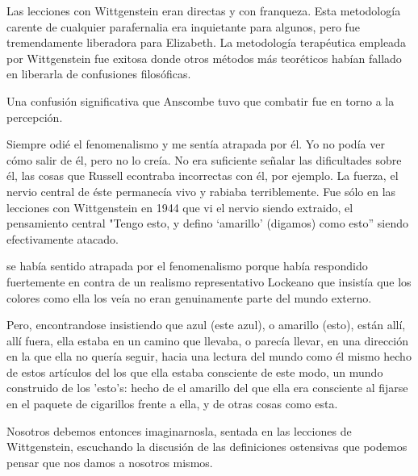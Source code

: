    Las lecciones con Wittgenstein eran directas y con franqueza. Esta metodología
   carente de cualquier parafernalia era inquietante para algunos, pero fue
   tremendamente liberadora para Elizabeth. La metodología terapéutica empleada por
   Wittgenstein fue exitosa donde otros métodos más teoréticos habían fallado en
   liberarla de confusiones filosóficas.\autocite[loc 9853 Chapter 4, Section 24,
   \S5]{monk1991duty}

   Una confusión significativa que Anscombe tuvo que combatir fue en torno a la
   percepción.

   Siempre odié el fenomenalismo y me sentía atrapada por él. Yo no podía ver cómo
   salir de él, pero no lo creía. No era suficiente señalar las dificultades sobre
   él, las cosas que Russell econtraba incorrectas con él, por ejemplo. La fuerza,
   el nervio central de éste permanecía vivo y rabiaba terriblemente. Fue sólo en
   las lecciones con Wittgenstein en 1944 que vi el nervio siendo extraido, el
   pensamiento central "Tengo esto, y defino `amarillo' (digamos) como esto''
   siendo efectivamente atacado.



   se había sentido atrapada por el fenomenalismo porque había respondido
   fuertemente en contra de un realismo representativo Lockeano que insistía que
   los colores como ella los veía no eran genuinamente parte del mundo externo.

   Pero, encontrandose insistiendo que azul (este azul), o amarillo (esto), están
   allí, allí fuera, ella estaba en un camino que llevaba, o parecía llevar, en una
   dirección en la que ella no quería seguir, hacia una lectura del mundo como él
   mismo hecho de estos artículos del los que ella estaba consciente de este modo,
   un mundo construido de los 'esto's: hecho de el amarillo del que ella era
   consciente al fijarse en el paquete de cigarillos frente a ella, y de otras
   cosas como esta.

   Nosotros debemos entonces imaginarnosla, sentada en las lecciones de
   Wittgenstein, escuchando la discusión de las definiciones ostensivas que podemos
   pensar que nos damos a nosotros mismos.
